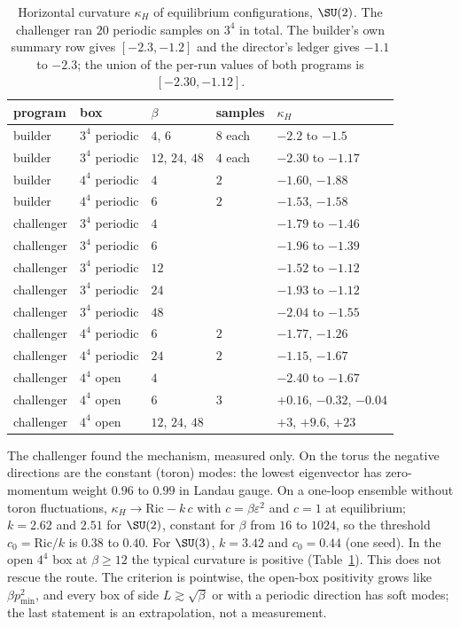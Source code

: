 \begin{table}[ht]
\centering
\small
\begin{tabular}{@{}lllll@{}}
\toprule
program & box & $\beta$ & samples & $\kappa_H$ \\
\midrule
builder & $3^4$ periodic & $4$, $6$ & $8$ each & $-2.2$ to $-1.5$ \\
builder & $3^4$ periodic & $12$, $24$, $48$ & $4$ each & $-2.30$ to $-1.17$ \\
builder & $4^4$ periodic & $4$ & $2$ & $-1.60$, $-1.88$ \\
builder & $4^4$ periodic & $6$ & $2$ & $-1.53$, $-1.58$ \\
challenger & $3^4$ periodic & $4$ & & $-1.79$ to $-1.46$ \\
challenger & $3^4$ periodic & $6$ & & $-1.96$ to $-1.39$ \\
challenger & $3^4$ periodic & $12$ & & $-1.52$ to $-1.12$ \\
challenger & $3^4$ periodic & $24$ & & $-1.93$ to $-1.12$ \\
challenger & $3^4$ periodic & $48$ & & $-2.04$ to $-1.55$ \\
challenger & $4^4$ periodic & $6$ & $2$ & $-1.77$, $-1.26$ \\
challenger & $4^4$ periodic & $24$ & $2$ & $-1.15$, $-1.67$ \\
\midrule
challenger & $4^4$ open & $4$ & & $-2.40$ to $-1.67$ \\
challenger & $4^4$ open & $6$ & $3$ & $+0.16$, $-0.32$, $-0.04$ \\
challenger & $4^4$ open & $12$, $24$, $48$ & & $+3$, $+9.6$, $+23$ \\
\bottomrule
\end{tabular}
\caption{Horizontal curvature $\kappa_H$ of equilibrium configurations, $\SU(2)$. The
challenger ran $20$ periodic samples on $3^4$ in total. The builder's own summary row gives
$[-2.3,-1.2]$ and the director's ledger gives $-1.1$ to $-2.3$; the union of the per-run values
of both programs is $[-2.30,-1.12]$.}
\label{neg:tab-curv}
\end{table}

The challenger found the mechanism, measured only. On the torus the negative directions are
the constant (toron) modes: the lowest eigenvector has zero-momentum weight $0.96$ to $0.99$ in
Landau gauge. On a one-loop ensemble without toron fluctuations, $\kappa_H\to\mathrm{Ric}-k\,c$
with $c=\beta\varepsilon^2$ and $c=1$ at equilibrium; $k=2.62$ and $2.51$ for $\SU(2)$,
constant for $\beta$ from $16$ to $1024$, so the threshold $c_0=\mathrm{Ric}/k$ is $0.38$ to
$0.40$. For $\SU(3)$, $k=3.42$ and $c_0=0.44$ (one seed). In the open $4^4$ box at $\beta\ge12$
the typical curvature is positive (Table~\ref{neg:tab-curv}). This does not rescue the route.
The criterion is pointwise, the open-box positivity grows like $\beta p_{\min}^2$, and every box
of side $L\gtrsim\sqrt\beta$ or with a periodic direction has soft modes; the last statement is
an extrapolation, not a measurement.

